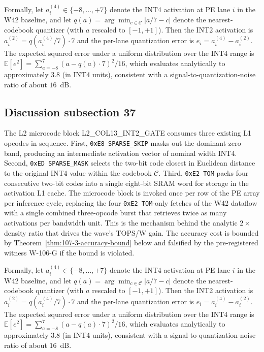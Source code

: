 Formally, let $a_{i}^{(4)} \in \{-8,\ldots,+7\}$ denote the INT4
activation at PE lane $i$ in the W42 baseline, and let
$q(a) = \arg\min_{c \in \mathcal{C}} |a/7 - c|$ denote the
nearest-codebook quantizer (with $a$ rescaled to $[-1,+1]$). Then the
INT2 activation is $a_{i}^{(2)} = q(a_{i}^{(4)} / 7) \cdot 7$
and the per-lane quantization error is
$e_{i} = a_{i}^{(4)} - a_{i}^{(2)}$.
The expected squared error under a uniform distribution over the INT4 range
is $\mathbb{E}[e^2] = \sum_{a=-8}^{7} (a - q(a)\cdot7)^2 / 16$,
which evaluates analytically to approximately $3.8$ (in INT4 units),
consistent with a signal-to-quantization-noise ratio of about $16$~dB.


\subsection{Discussion subsection 37}

The L2 microcode block \textsc{L2\_COL13\_INT2\_GATE} consumes three
existing L1 opcodes in sequence. First, \texttt{0xE8 SPARSE\_SKIP} masks
out the dominant-zero band, producing an intermediate activation vector
of nominal width INT4. Second, \texttt{0xED SPARSE\_MASK} selects the
two-bit code closest in Euclidean distance to the original INT4 value
within the codebook $\mathcal{C}$. Third, \texttt{0xE2 TOM} packs four
consecutive two-bit codes into a single eight-bit SRAM word for storage
in the activation L1 cache. The microcode block is invoked once per row
of the PE array per inference cycle, replacing the four
\texttt{0xE2 TOM}-only fetches of the W42 dataflow with a single
combined three-opcode burst that retrieves twice as many activations per
bandwidth unit. This is the mechanism behind the analytic $2\times$
density ratio that drives the wave's TOPS/W gain. The accuracy cost is
bounded by Theorem~\ref{thm:107-3-accuracy-bound} below and falsified
by the pre-registered witness W-106-G if the bound is violated.

Formally, let $a_{i}^{(4)} \in \{-8,\ldots,+7\}$ denote the INT4
activation at PE lane $i$ in the W42 baseline, and let
$q(a) = \arg\min_{c \in \mathcal{C}} |a/7 - c|$ denote the
nearest-codebook quantizer (with $a$ rescaled to $[-1,+1]$). Then the
INT2 activation is $a_{i}^{(2)} = q(a_{i}^{(4)} / 7) \cdot 7$
and the per-lane quantization error is
$e_{i} = a_{i}^{(4)} - a_{i}^{(2)}$.
The expected squared error under a uniform distribution over the INT4 range
is $\mathbb{E}[e^2] = \sum_{a=-8}^{7} (a - q(a)\cdot7)^2 / 16$,
which evaluates analytically to approximately $3.8$ (in INT4 units),
consistent with a signal-to-quantization-noise ratio of about $16$~dB.


